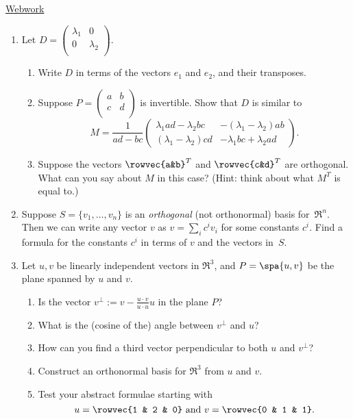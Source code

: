 \href{\webworkurl}{Webwork}


\begin{enumerate}
\item Let $D=\begin{pmatrix}
\lambda_1 & 0 \\
0 & \lambda_2 \\
\end{pmatrix}$.
\begin{enumerate}
\item Write $D$ in terms of the vectors $e_1$ and $e_2$, and their transposes.
\item Suppose $P=\begin{pmatrix}
a & b \\
c & d \\
\end{pmatrix}$ is invertible.  Show that $D$ is similar to
\[
M=\frac{1}{ad-bc}\begin{pmatrix}
\lambda_1ad-\lambda_2bc & -(\lambda_1-\lambda_2)ab \\[1mm]
(\lambda_1-\lambda_2)cd & -\lambda_1bc + \lambda_2ad
\end{pmatrix}.
\]
\item Suppose the vectors $\rowvec{a&b}^T$ and $\rowvec{c&d}^T$ are orthogonal.  What can you say about $M$ in this case? (Hint: think about what \(M^T\) is equal to.)
\end{enumerate}


\item \label{orthogprob} Suppose $S=\{v_1, \ldots, v_n \}$ is an \emph{orthogonal} (not orthonormal) basis for~$\Re^n$.  Then we can write any vector $v$ as $v=\sum_ic^iv_i$ for some constants $c^i$.  Find a formula for the constants $c^i$ in terms of $v$ and the vectors in~$S$.


\item \label{orthogprojprob} Let $u,v$ be linearly independent vectors in $\Re^3$, and $P=\spa \{ u,v\}$ be the plane spanned by $u$ and $v$.  
\begin{enumerate}
\item Is the vector $v^\bot := v-\frac{u\cdot v}{u\cdot u}u$ in the plane $P$?
\item  What is the (cosine of the) angle between $v^\bot$ and $u$?
\item %
How can you find a third vector perpendicular to both $u$ and $v^\bot$?
\item  Construct an orthonormal basis for $\Re^3$ from $u$ and $v$.
\item  Test your abstract formulae starting with 
\[
u=\rowvec{1 & 2 & 0} \text{ and } v=\rowvec{0 & 1 & 1}.
\]
\end{enumerate}


\end{enumerate}
